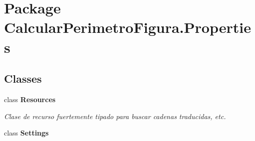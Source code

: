\hypertarget{namespace_calcular_perimetro_figura_1_1_properties}{}\section{Package Calcular\+Perimetro\+Figura.\+Properties}
\label{namespace_calcular_perimetro_figura_1_1_properties}
\subsection*{Classes}
\begin{DoxyCompactItemize}
\item 
class {\bfseries Resources}
\begin{DoxyCompactList}\small\item\em Clase de recurso fuertemente tipado para buscar cadenas traducidas, etc. \end{DoxyCompactList}\item 
class {\bfseries Settings}
\end{DoxyCompactItemize}
